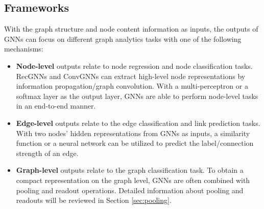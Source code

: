 	\subsection{Frameworks}
With the graph structure and node content information as inputs,  the outputs of  GNNs can focus on different graph analytics tasks with one of the following mechanisms:
	\begin{itemize}
		\item \textbf{Node-level} outputs relate to node regression and node classification tasks. RecGNNs and ConvGNNs can extract high-level node representations by information propagation/graph convolution. With a multi-perceptron or a softmax layer as the output layer, GNNs are able to perform node-level tasks in an end-to-end manner.
		
		\item \textbf{Edge-level} outputs relate to the edge classification and link prediction tasks.  With two nodes' hidden representations from GNNs as inputs, a similarity function or a neural network can be utilized to predict the label/connection strength of an edge.
		
		
		\item \textbf{Graph-level} outputs relate to the graph classification task. To obtain a compact representation on the graph level, GNNs are often combined with pooling and readout operations. Detailed information about pooling and readouts will be reviewed in Section \ref{sec:pooling}.
	\end{itemize}
    
